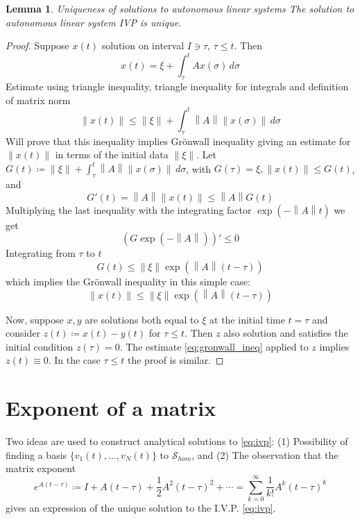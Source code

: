 \documentclass{article}
\newtheorem{lemma}[theorem]{Lemma}
\newcommand{\norm}[1]{\left\lVert#1\right\rVert}
\begin{document}
\begin{lemma}{Uniqueness of solutions to autonomous linear systems}
	The solution to autonomous linear system IVP is unique.
\end{lemma}
\begin{proof}
	Suppose $x(t)$ solution on interval $I \ni \tau$, $\tau \le t$. Then
	\begin{equation}\label{eq:intrep}
		x(t) = \xi + \int_\tau^t Ax(\sigma) \, d\sigma
	\end{equation}
	Estimate using triangle inequality, triangle inequality for integrals and definition of matrix norm
	$$ \norm{x(t)} \le \norm \xi + \int_\tau^t \norm A \norm{x(\sigma)} \, d\sigma $$
	Will prove that this inequality implies Grönwall inequality
	giving an estimate for $\norm{x(t)}$ in terms of the initial data $\norm \xi$.
	Let $G(t) \coloneqq \norm \xi + \int_\tau^t \norm A \norm{x(\sigma)} \, d\sigma $,
	with $G(\tau) = \xi, \norm{x(t)} \le G(t)$, and
	$$ G'(t) = \norm A \norm{x(t)} \le \norm A G(t) $$
	Multiplying the last inequality with the integrating factor $\exp(-\norm A t)$ we get
	$$ (G \exp(-\norm A))' \le 0 $$
	Integrating from $\tau$ to $t$
	$$ G(t) \le \norm \xi \exp(\norm A (t - \tau)) $$
	which implies the Grönwall inequality in this simple case:
	\begin{equation}\label{eq:gronwall_ineq}
		\norm{x(t)} \le \norm \xi \exp(\norm A (t - \tau))
	\end{equation}

	Now, suppose $x, y$ are solutions both equal to $\xi$ at the initial time $t = \tau$
	and consider $z(t) \coloneqq x(t) - y(t)$ for $\tau \le t$.
	Then $z$ also solution and satisfies the initial condition $z(\tau) = 0$.
	The estimate \eqref{eq:gronwall_ineq} applied to $z$ implies $z(t) \equiv 0$.
	In the case $\tau \le t$ the proof is similar.
\end{proof}

\section{Exponent of a matrix}

Two ideas are used to construct analytical solutions to \eqref{eq:ivp}:
(1) Possibility of finding a basis $\{v_1(t), \ldots, v_N(t)\}$ to $\mathcal S_{hom}$,
and (2) The observation that the matrix exponent
$$ e^{A(t - \tau)} \coloneqq I + A (t - \tau) + \frac12 A^2 (t - \tau)^2 + \cdots = \sum_{k=0}^\infty \frac1{k!} A^k (t - \tau)^k $$
gives an expression of the unique solution to the I.V.P. \eqref{eq:ivp}.
\end{document}
